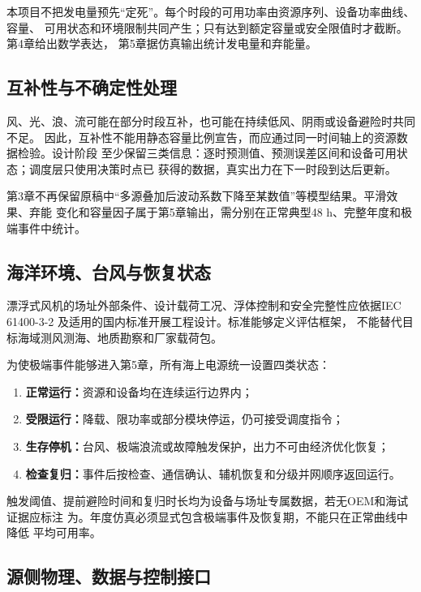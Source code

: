 本项目不把发电量预先“定死”。每个时段的可用功率由资源序列、设备功率曲线、容量、
可用状态和环境限制共同产生；只有达到额定容量或安全限值时才截断。第4章给出数学表达，
第5章据仿真输出统计发电量和弃能量。

\subsection{互补性与不确定性处理}

风、光、浪、流可能在部分时段互补，也可能在持续低风、阴雨或设备避险时共同不足。
因此，互补性不能用静态容量比例宣告，而应通过同一时间轴上的资源数据检验。设计阶段
至少保留三类信息：逐时预测值、预测误差区间和设备可用状态；调度层只使用决策时点已
获得的数据，真实出力在下一时段到达后更新。

第3章不再保留原稿中“多源叠加后波动系数下降至某数值”等模型结果。平滑效果、弃能
变化和容量因子属于第5章输出，需分别在正常典型48 h、完整年度和极端事件中统计。

\subsection{海洋环境、台风与恢复状态}

漂浮式风机的场址外部条件、设计载荷工况、浮体控制和安全完整性应依据IEC 61400-3-2
及适用的国内标准开展工程设计\cite{iec61400-3-2,gbz44047}。标准能够定义评估框架，
不能替代目标海域测风测海、地质勘察和厂家载荷包。

为使极端事件能够进入第5章，所有海上电源统一设置四类状态：
\begin{enumerate}
  \item {\bfseries 正常运行：}资源和设备均在连续运行边界内；
  \item {\bfseries 受限运行：}降载、限功率或部分模块停运，仍可接受调度指令；
  \item {\bfseries 生存停机：}台风、极端浪流或故障触发保护，出力不可由经济优化恢复；
  \item {\bfseries 检查复归：}事件后按检查、通信确认、辅机恢复和分级并网顺序返回运行。
\end{enumerate}

触发阈值、提前避险时间和复归时长均为设备与场址专属数据，若无OEM和海试证据应标注
为\assumptiontag。年度仿真必须显式包含极端事件及恢复期，不能只在正常曲线中降低
平均可用率。

\subsection{源侧物理、数据与控制接口}

